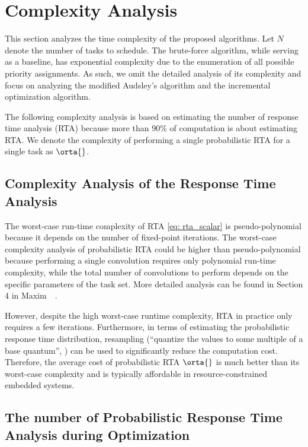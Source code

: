 
    \section{Complexity Analysis}
	\label{section_complexity_analysis}


This section analyzes the time complexity of the proposed algorithms. Let $N$ denote the number of tasks to schedule. The brute-force algorithm, while serving as a baseline, has exponential complexity due to the enumeration of all possible priority assignments. As such, we omit the detailed analysis of its complexity and focus on analyzing the modified Audsley's algorithm and the incremental optimization algorithm.


The following complexity analysis is based on estimating the number of response time analysis (RTA) because more than 90\% of computation is about estimating RTA. We denote the complexity of performing a single probabilistic RTA for a single task as $\orta{}$.
    

\subsection{Complexity Analysis of the Response Time Analysis}
    The worst-case run-time complexity of RTA \eqref{eq: rta_scalar} is pseudo-polynomial because it depends on the number of fixed-point iterations. The worst-case complexity analysis of probabilistic RTA could be higher than pseudo-polynomial because performing a single convolution requires only polynomial run-time complexity, while the total number of convolutions to perform depends on the specific parameters of the task set. More detailed analysis can be found in Section 4 in Maxim~\etal~\cite{Maxim2022ProbabilisticA}.
    
    However, despite the high worst-case runtime complexity, RTA in practice only requires a few iterations. Furthermore, in terms of estimating the probabilistic response time distribution, resampling (``quantize the values to some multiple of a base quantum'', \cite{Maxim2022ProbabilisticA}) can be used to significantly reduce the computation cost.
    Therefore, the average cost of probabilistic RTA $\orta{}$ is much better than its worst-case complexity and is typically affordable in resource-constrained embedded systems.

\subsection{The number of Probabilistic Response Time Analysis during Optimization}
